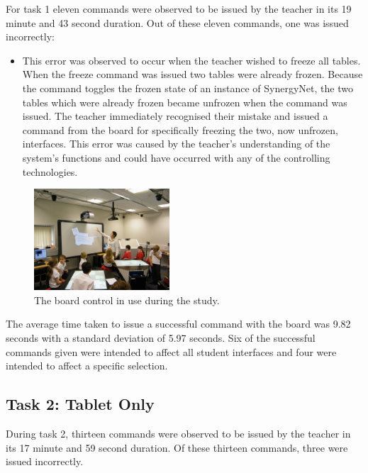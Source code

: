 \documentclass[link]{IWCOMP}
\begin{document}
For task 1 eleven commands were observed to be issued by the teacher in its 19 minute and 43 second duration.
Out of these eleven commands, one was issued incorrectly:

\begin{itemize}
\item This error was observed to occur when the teacher wished to freeze all tables.
When the freeze command was issued two tables were already frozen.
Because the command toggles the frozen state of an instance of SynergyNet, the two tables which were already frozen became unfrozen when the command was issued.
The teacher immediately recognised their mistake and issued a command from the board for specifically freezing the two, now unfrozen, interfaces.
This error was caused by the teacher's understanding of the system's functions and could have occurred with any of the controlling technologies.
\end{itemize}

\begin{figure}[h]
   \centering
   \includegraphics[width=0.45\textwidth]{figures/new_study_board.png}
   \caption{The board control in use during the study.}
   \label{fig:newStudyBoard}
\end{figure}

The average time taken to issue a successful command with the board was 9.82 seconds with a standard deviation of 5.97 seconds.
Six of the successful commands given were intended to affect all student interfaces and four were intended to affect a specific selection.

\subsection{Task 2: Tablet Only}
\label{subsec:resultsTask2}

During task 2, thirteen commands were observed to be issued by the teacher in its 17 minute and 59 second duration.
Of these thirteen commands, three were issued incorrectly.
\end{document}
